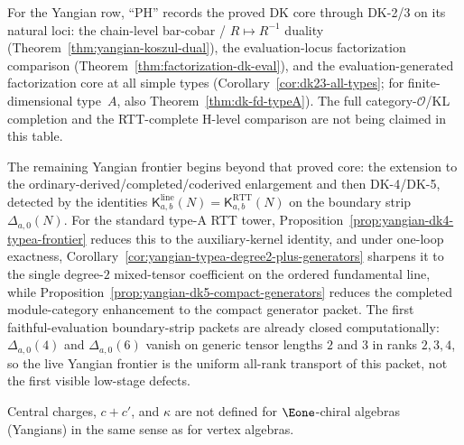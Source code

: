For the Yangian row, ``PH'' records the proved DK core through DK-2/3
on its natural loci: the chain-level bar-cobar / $R \mapsto R^{-1}$
duality
(Theorem~\ref{thm:yangian-koszul-dual}), the evaluation-locus
factorization comparison
(Theorem~\ref{thm:factorization-dk-eval}), and the
evaluation-generated factorization core at all simple types
(Corollary~\ref{cor:dk23-all-types}; for finite-dimensional
type~$A$, also Theorem~\ref{thm:dk-fd-typeA}).  The full
category-$\mathcal{O}$/KL completion and the RTT-complete H-level
comparison are not being claimed in this table.

The remaining Yangian frontier begins beyond that proved core: the
extension to the ordinary-derived/completed/coderived enlargement and
then DK-4/DK-5, detected by the identities
$\mathsf{K}^{\mathrm{line}}_{a,b}(N)
=\mathsf{K}^{\mathrm{RTT}}_{a,b}(N)$
on the boundary strip $\Delta_{a,0}(N)$.  For the standard type-A RTT
tower, Proposition~\ref{prop:yangian-dk4-typea-frontier} reduces this
to the auxiliary-kernel identity, and under one-loop exactness,
Corollary~\ref{cor:yangian-typea-degree2-plus-generators} sharpens it
to the single degree-$2$ mixed-tensor coefficient on the ordered
fundamental line, while
Proposition~\ref{prop:yangian-dk5-compact-generators} reduces the
completed module-category enhancement to the compact generator packet.
The first faithful-evaluation boundary-strip packets are already
closed computationally: $\Delta_{a,0}(4)$ and $\Delta_{a,0}(6)$
vanish on generic tensor lengths $2$ and $3$ in ranks $2,3,4$, so the
live Yangian frontier is the uniform all-rank transport of this
packet, not the first visible low-stage defects.

Central charges, $c{+}c'$, and $\kappa$ are not defined for
$\Eone$-chiral algebras (Yangians) in the same sense as for
vertex algebras.

